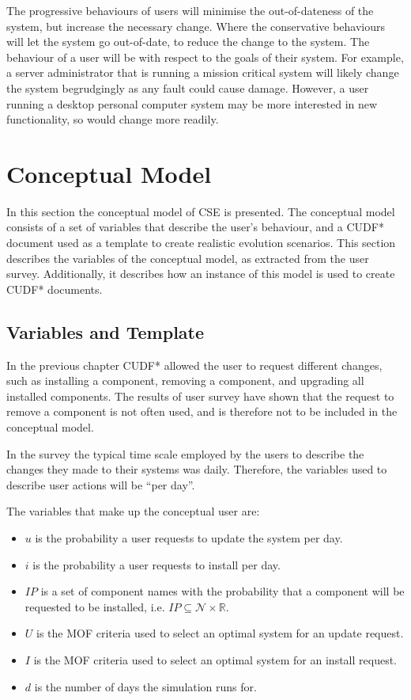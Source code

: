 The progressive behaviours of users will minimise the out-of-dateness of the system, but increase the necessary change.
Where the conservative behaviours will let the system go out-of-date, to reduce the change to the system.
The behaviour of a user will be with respect to the goals of their system.
For example, a server administrator that is running a mission critical system will likely change the system begrudgingly as any fault could cause damage.
However, a user running a desktop personal computer system may be more interested in new functionality, so would change more readily.

\section{Conceptual Model}
In this section the conceptual model of CSE is presented.
The conceptual model consists of a set of variables that describe the user's behaviour, 
and a CUDF* document used as a template to create realistic evolution scenarios.
This section describes the variables of the conceptual model, as extracted from the user survey.
Additionally, it describes how an instance of this model is used to create CUDF* documents.

\subsection{Variables and Template}
In the previous chapter CUDF* allowed the user to request different changes, such as 
installing a component, removing a component, and upgrading all installed components.
The results of user survey have shown that the request to remove a component is not often used, and is therefore not to be included in the conceptual model.

In the survey the typical time scale employed by the users to describe the changes they made to their systems was daily.
Therefore, the variables used to describe user actions will be ``per day''. 

The variables that make up the conceptual user are: 
\begin{itemize}
  \item $u$ is the probability a user requests to update the system per day.
  \item $i$ is the probability a user requests to install per day.
  \item $IP$ is a set of component names with the probability that a component will be requested to be installed, i.e. $IP \subseteq \mathcal{N} \times \mathbb{R}$.
  \item $U$ is the MOF criteria used to select an optimal system for an update request.
  \item $I$ is the MOF criteria used to select an optimal system for an install request.
  \item $d$ is the number of days the simulation runs for.
\end{itemize}

